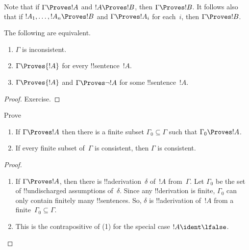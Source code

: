 Note that if $\Gamma \Proves !A$ and $!A
\Proves !B$, then $\Gamma \Proves !B$. It follows also that if $!A_1,
\dots, !A_n \Proves !B$ and $\Gamma \Proves !A_i$ for each~$i$, then
$\Gamma \Proves !B$.

\begin{prop}
The following are equivalent. 
    \begin{enumerate}
      \item \( \Gamma \) is inconsistent.
      \item \( \Gamma \Proves {!A} \) for every !!{sentence}~\( {!A} \).
      \item \( \Gamma \Proves {!A} \) and \( \Gamma \Proves \lnot {!A} \) for some !!{sentence}~\( {!A} \).
    \end{enumerate}
\end{prop}

\begin{proof}
Exercise.
\end{proof}


\begin{prob}
Prove 
\end{prob}




\begin{prop}[Compactness]
  \begin{enumerate}
  \item If $\Gamma \Proves !A$ then there is a finite subset $\Gamma_0
    \subseteq \Gamma$ such that $\Gamma_0 \Proves !A$.
  \item If every finite subset of~$\Gamma$ is
    consistent, then $\Gamma$ is consistent.
  \end{enumerate}
\end{prop}

\begin{proof}
  \begin{enumerate}
    \item If $\Gamma \Proves !A$, then there is
      !!a{derivation}~$\delta$ of~$!A$ from~$\Gamma$. Let $\Gamma_0$
      be the set of !!{undischarged} assumptions of~$\delta$.  Since
      any !!{derivation} is finite, $\Gamma_0$ can only contain
      finitely many !!{sentence}s.  So, $\delta$ is !!a{derivation}
      of~$!A$ from a finite~$\Gamma_0 \subseteq \Gamma$.
    \item This is the contrapositive of (1) for the special case $!A
      \ident \lfalse$.
  \end{enumerate}
\end{proof}





